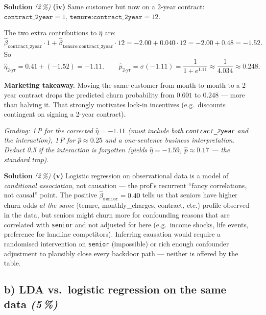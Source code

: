 \documentclass[11pt,a4paper]{article}
\newcommand{\subpoints}[1]{\textit{(#1\,\%)}}
\newcommand{\sol}{\noindent\textbf{Solution}}
\begin{document}
\medskip
\sol{} \subpoints{2} \textbf{(iv)} Same customer but now on a 2-year contract:
$\texttt{contract\_2year}=1$, $\texttt{tenure:contract\_2year}=12$.

The two extra contributions to $\hat\eta$ are:
$$\hat\beta_{\texttt{contract\_2year}}\cdot 1 + \hat\beta_{\texttt{tenure:contract\_2year}}\cdot 12
   = -2.00 + 0.040\cdot 12 = -2.00 + 0.48 = -1.52.$$
So
$$\hat\eta_{\text{2-yr}} = 0.41 + (-1.52) = \boxed{-1.11}, \qquad
   \hat p_{\text{2-yr}} = \sigma(-1.11) = \frac{1}{1+e^{1.11}} \approx \frac{1}{4.034} \approx \boxed{0.248}.$$

\textbf{Marketing takeaway.} Moving the same customer from month-to-month to a 2-year contract
drops the predicted churn probability from $0.601$ to $0.248$ --- more than halving it. That
strongly motivates lock-in incentives (e.g.\ discounts contingent on signing a 2-year contract).

\noindent\emph{Grading: 1\,P for the corrected $\hat\eta = -1.11$ (must include both
\texttt{contract\_2year} and the interaction), 1\,P for $\hat p \approx 0.25$ and a one-sentence
business interpretation. Deduct 0.5 if the interaction is forgotten (yields $\hat\eta = -1.59$,
$\hat p \approx 0.17$ --- the standard trap).}

\medskip
\sol{} \subpoints{2} \textbf{(v)} Logistic regression on observational data is a model of
\emph{conditional association}, not causation --- the prof's recurrent ``fancy correlations, not
causal'' point. The positive $\hat\beta_{\texttt{senior}}=0.40$ tells us that seniors have higher
churn odds \emph{at the same} (tenure, monthly\_charges, contract, etc.) profile observed in the
data, but seniors might churn more for confounding reasons that are correlated with
\texttt{senior} and not adjusted for here (e.g.\ income shocks, life events, preference for
landline competitors). Inferring causation would require a randomised intervention on
\texttt{senior} (impossible) or rich enough confounder adjustment to plausibly close every backdoor
path --- neither is offered by the table.

\subsection*{b) LDA vs.\ logistic regression on the same data \subpoints{5}}
\end{document}
